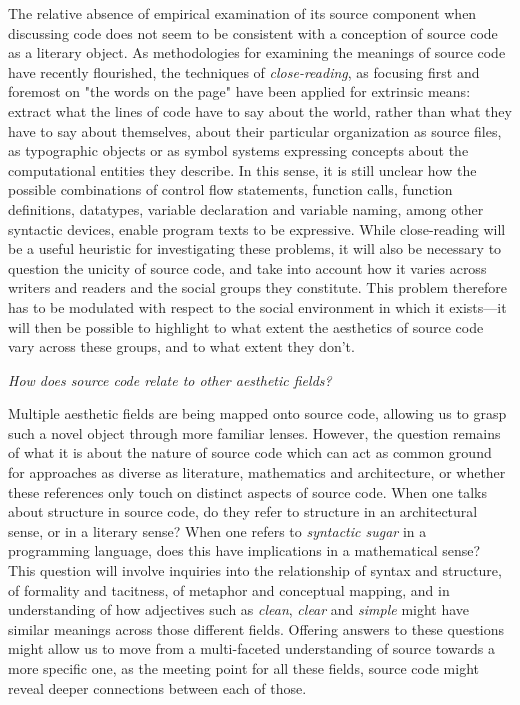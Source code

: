 The relative absence of empirical examination of its source component when discussing code does not seem to be consistent with a conception of source code as a literary object. As methodologies for examining the meanings of source code have recently flourished, the techniques of \emph{close-reading}, as focusing first and foremost on "the words on the page" \citep{richards_practical_1930} have been applied for extrinsic means: extract what the lines of code have to say about the world, rather than what they have to say about themselves, about their particular organization as source files, as typographic objects or as symbol systems expressing concepts about the computational entities they describe. In this sense, it is still unclear how the possible combinations of control flow statements, function calls, function definitions, datatypes, variable declaration and variable naming, among other syntactic devices, enable program texts to be expressive. While close-reading will be a useful heuristic for investigating these problems, it will also be necessary to question the unicity of source code, and take into account how it varies across writers and readers and the social groups they constitute. This problem therefore has to be modulated with respect to the social environment in which it exists—it will then be possible to highlight to what extent the aesthetics of source code vary across these groups, and to what extent they don't.

\vspace{1\baselineskip}

\emph{How does source code relate to other aesthetic fields?}

Multiple aesthetic fields are being mapped onto source code, allowing us to grasp such a novel object through more familiar lenses. However, the question remains of what it is about the nature of source code which can act as common ground for approaches as diverse as literature, mathematics and architecture, or whether these references only touch on distinct aspects of source code. When one talks about structure in source code, do they refer to structure in an architectural sense, or in a literary sense? When one refers to \emph{syntactic sugar} in a programming language, does this have implications in a mathematical sense? This question will involve inquiries into the relationship of syntax and structure, of formality and tacitness,  of metaphor and conceptual mapping, and in understanding of how adjectives such as \emph{clean}, \emph{clear} and \emph{simple} might have similar meanings across those different fields. Offering answers to these questions might allow us to move from a multi-faceted understanding of source towards a more specific one, as the meeting point for all these fields, source code might reveal deeper connections between each of those.

